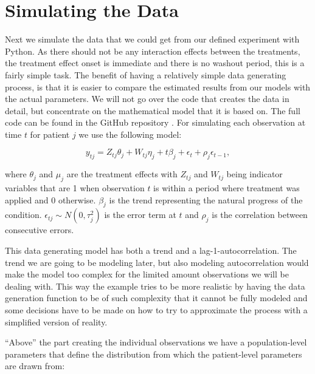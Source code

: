 \documentclass[12pt,a4paper,leqno]{report}
\theoremstyle{plain}
\theoremstyle{definition}
\theoremstyle{remark}
\begin{document}
\section{Simulating the Data}

Next we simulate the data that we could get from our defined experiment with Python.
As there should not be any interaction effects between the treatments, the treatment
effect onset is immediate and there is no washout period, this is a fairly simple
task. The benefit of having a relatively simple data generating process, is that it is
easier to compare the estimated results from our models with the actual parameters. We will not go
over the code that creates the data in detail, but concentrate on
the mathematical model that it is based on. The full code can be found in the GitHub repository
\cite{github}. For simulating each observation at time \(t\) for patient \(j\) we use the following model:

\begin{def}\label{simulationmodel}
    \begin{equation}\label{}
        y_{tj} = Z_{tj}\theta_{j} + W_{tj}\eta_{j} + t\beta_j + \epsilon_t + \rho_j\epsilon_{t-1},
    \end{equation}
\end{def}where \(\theta_j\) and \(\mu_j\) are the treatment effects with \(Z_{tj}\) and \(W_{tj}\) being indicator
variables that are 1 when observation \(t\) is within a period where treatment was applied and
0 otherwise. \(\beta_j\) is the trend representing the natural progress of the
condition. \(\epsilon_{tj} \sim N(0,\tau_j^2) \) is the error term at \(t\) and
\(\rho_j\) is the correlation between consecutive errors.

This data generating model has both a trend and a lag-1-autocorrelation. The trend we
are going to be modeling later, but also modeling autocorrelation would make the model
too complex for the limited amount observations we will be dealing with. This way the example tries to be more realistic
by having the data generation function to be of such complexity that it cannot be
fully modeled and some decisions have to be made on how to try to approximate
the process with a simplified version of reality.

``Above'' the part creating the individual observations we have a population-level parameters
that define the distribution from which the patient-level parameters are drawn from:

\bigskip
\end{document}

